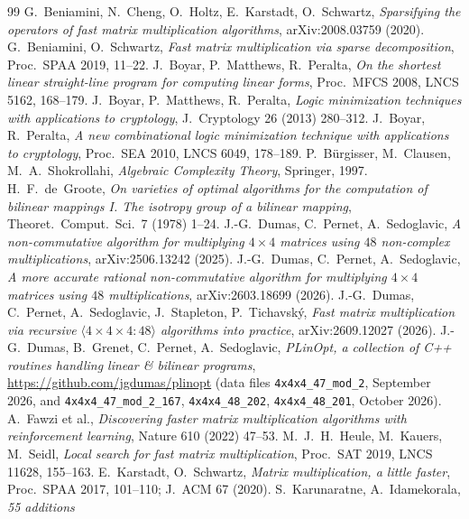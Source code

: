 \documentclass[11pt]{article}
\theoremstyle{remark}
\begin{document}
\begin{thebibliography}{99}
 G.~Beniamini, N.~Cheng, O.~Holtz, E.~Karstadt,
O.~Schwartz, \emph{Sparsifying the operators of fast matrix
multiplication algorithms}, arXiv:2008.03759 (2020).
 G.~Beniamini, O.~Schwartz, \emph{Fast matrix
multiplication via sparse decomposition}, Proc.\ SPAA 2019, 11--22.
 J.~Boyar, P.~Matthews, R.~Peralta, \emph{On the
shortest linear straight-line program for computing linear forms},
Proc.\ MFCS 2008, LNCS 5162, 168--179.
 J.~Boyar, P.~Matthews, R.~Peralta, \emph{Logic
minimization techniques with applications to cryptology}, J.\
Cryptology 26 (2013) 280--312.
 J.~Boyar, R.~Peralta, \emph{A new combinational logic
minimization technique with applications to cryptology}, Proc.\ SEA
2010, LNCS 6049, 178--189.
 P.~B\"urgisser, M.~Clausen, M.~A.~Shokrollahi,
\emph{Algebraic Complexity Theory}, Springer, 1997.
 H.~F.~de~Groote, \emph{On varieties of optimal
algorithms for the computation of bilinear mappings I. The isotropy
group of a bilinear mapping}, Theoret.\ Comput.\ Sci.\ 7 (1978) 1--24.
\bibitem{DPS25} J.-G.~Dumas, C.~Pernet, A.~Sedoglavic, \emph{A
non-commutative algorithm for multiplying $4\times4$ matrices using
$48$ non-complex multiplications}, arXiv:2506.13242 (2025).
 J.-G.~Dumas, C.~Pernet, A.~Sedoglavic, \emph{A more
accurate rational non-commutative algorithm for multiplying $4\times4$
matrices using $48$ multiplications}, arXiv:2603.18699 (2026).
 J.-G.~Dumas, C.~Pernet, A.~Sedoglavic, J.~Stapleton,
P.~Tichavsk\'y, \emph{Fast matrix multiplication via recursive
$\langle4\times4\times4:48\rangle$ algorithms into practice},
arXiv:2609.12027 (2026).
 J.-G.~Dumas, B.~Grenet, C.~Pernet, A.~Sedoglavic,
\emph{PLinOpt, a collection of C++ routines handling linear \&
bilinear programs}, \url{https://github.com/jgdumas/plinopt} (data
files \texttt{4x4x4\_47\_mod\_2}, September 2026, and
\texttt{4x4x4\_47\_mod\_2\_167}, \texttt{4x4x4\_48\_202},
\texttt{4x4x4\_48\_201}, October 2026).
 A.~Fawzi et al., \emph{Discovering faster matrix
multiplication algorithms with reinforcement learning}, Nature 610
(2022) 47--53.
 M.~J.~H.~Heule, M.~Kauers, M.~Seidl, \emph{Local search
for fast matrix multiplication}, Proc.\ SAT 2019, LNCS 11628, 155--163.
\bibitem{KS17} E.~Karstadt, O.~Schwartz, \emph{Matrix multiplication, a
little faster}, Proc.\ SPAA 2017, 101--110; J.\ ACM 67 (2020).
 S.~Karunaratne, A.~Idamekorala, \emph{55 additions
}
\end{thebibliography}
\end{document}
